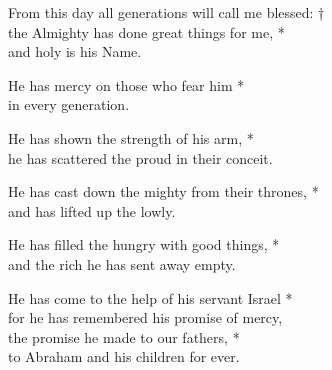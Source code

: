 
From this day all generations will call me blessed: †\\
the Almighty has done great things for me, *\\
and holy is his Name.

He has mercy on those who fear him *\\
in every generation.

He has shown the strength of his arm, *\\
he has scattered the proud in their conceit.

He has cast down the mighty from their thrones, *\\
and has lifted up the lowly.

He has filled the hungry with good things, *\\
and the rich he has sent away empty.

He has come to the help of his servant Israel *\\
for he has remembered his promise of mercy,\\
the promise he made to our fathers, *\\
to Abraham and his children for ever.